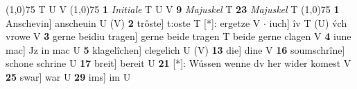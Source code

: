 \documentclass[8pt,a4paper,notitlepage]{article}
\begin{document}
\begin{table}[ht]
\begin{minipage}[t]{0.5\linewidth}
\scriptsize
\line(1,0){75} \newline
T U V \newline
\line(1,0){75} \newline
\textbf{1} \textit{Initiale} T U V  \textbf{9} \textit{Majuskel} T  \textbf{23} \textit{Majuskel} T  \newline
\line(1,0){75} \newline
\textbf{1} Anschevin] anscheuin U (V) \textbf{2} trôste] t:oste T [*]: ergetze V  $\cdot$ iuch] îv T (U) v́ch vrowe V \textbf{3} gerne beidiu tragen] gerne beide tragen T beide gerne clagen V \textbf{4} iune mac] Jz in mac U \textbf{5} klagelîchen] clegelich U (V) \textbf{13} die] dine V \textbf{16} soumschrîne] schone schrine U \textbf{17} breit] bereit U \textbf{21} [*]: Wússen wenne dv her wider komest V \textbf{25} swar] war U \textbf{29} ims] im U \newline
\end{minipage}
\end{table}
\end{document}
